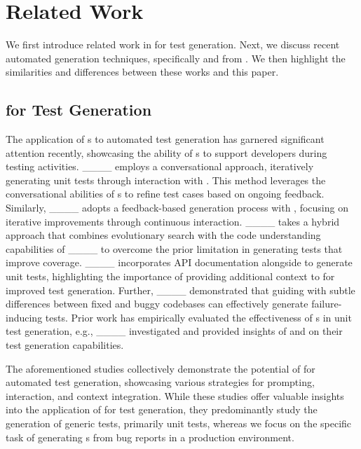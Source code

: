 \section{Related Work}
\label{sec:relatedwork}

We first introduce related work in \llm for test generation. 
Next, we discuss recent automated \brt generation techniques, specifically \libro and \sweagentplus from \swtbench. 
We then highlight the similarities and differences between these works and this paper.

\subsection{\llm for Test Generation}
\label{sec:relatedwork:llmtestgen}

The application of \llm{}s to automated test generation has garnered significant attention recently, showcasing the ability of \llm{}s to support developers during testing activities. 
____ employs a conversational approach, iteratively generating unit tests through interaction with \chatgpt. 
This method leverages the conversational abilities of \llm{}s to refine test cases based on ongoing feedback. 
Similarly, ____ adopts a feedback-based generation process with \chatgpt, focusing on iterative improvements through continuous interaction.
____ takes a hybrid approach that combines evolutionary search with the code understanding capabilities of \codex____ to overcome the prior limitation in generating tests that improve coverage.  
____ incorporates API documentation alongside \gptthreepfive to generate unit tests, highlighting the importance of providing additional context to \llm for improved test generation.
Further, ____ demonstrated that guiding \chatgpt with subtle differences between fixed and buggy codebases can effectively generate failure-inducing tests. 
Prior work has empirically evaluated the effectiveness of \llm{}s in unit test generation, e.g., ____ investigated and provided insights of \gptthreepfive and \codex on their test generation capabilities. 

The aforementioned studies collectively demonstrate the potential of \llm for automated test generation, showcasing various strategies for prompting, interaction, and context integration.
While these studies offer valuable insights into the application of \llm for test generation, they predominantly study the generation of generic tests, primarily unit tests, whereas we focus on the specific task of generating \brt{}s from bug reports in a production environment.

